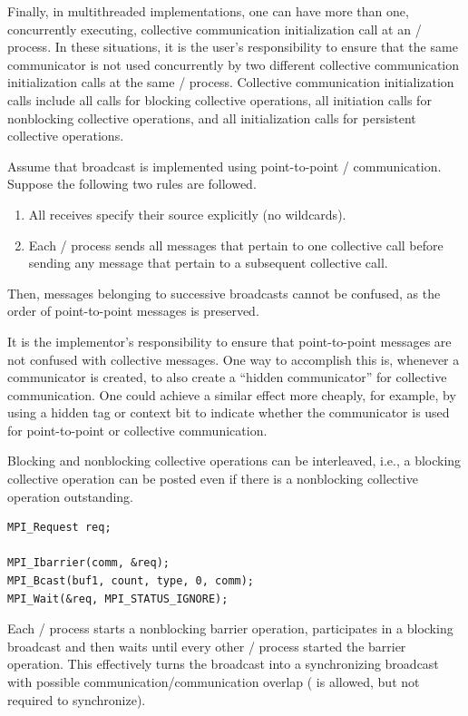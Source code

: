 Finally, in multithreaded implementations, one can have more than one,
concurrently executing, collective communication initialization call at an \MPI/ process.
In these situations, it is the user's responsibility to ensure that
the same communicator is not used concurrently by two different
collective communication initialization calls at the same \MPI/ process.
Collective communication initialization calls include
all calls for blocking collective operations,
all initiation calls for nonblocking collective operations, and
all initialization calls for persistent collective operations.

\begin{implementors}
Assume that broadcast is implemented using point-to-point \MPI/ communication.
Suppose the following two rules are followed.
\begin{enumerate}
\item
All receives specify their source explicitly (no wildcards).
\item
Each \MPI/ process sends all messages that pertain to one collective call before
sending any message that pertain to a subsequent collective call.
\end{enumerate}
Then, messages belonging to successive broadcasts cannot be confused,
as the order of point-to-point messages is preserved.

It is the implementor's responsibility to
ensure that point-to-point messages are not confused with collective
messages.  One way to accomplish this is, whenever a communicator is
created, to also create a ``hidden communicator'' for collective communication.
One could achieve a similar
effect more cheaply, for example, by using a hidden
tag or context bit to indicate
whether the communicator is used for point-to-point or collective
communication.
\end{implementors}

\begin{example}
\label{coll-nbexN1}
%
%
Blocking and nonblocking collective operations can be interleaved, i.e.,
a blocking collective operation can be posted even if there is a
nonblocking collective operation outstanding.

\begin{lstlisting}[language={[MPI]C}]
MPI_Request req;

MPI_Ibarrier(comm, &req);
MPI_Bcast(buf1, count, type, 0, comm);
MPI_Wait(&req, MPI_STATUS_IGNORE);
\end{lstlisting}

Each \MPI/ process starts a nonblocking barrier operation, participates in a
blocking broadcast and then waits until every other \MPI/ process started the
barrier operation. This effectively turns the broadcast into a
synchronizing broadcast with possible communication/communication
overlap ( is allowed, but not required to
synchronize).
\end{example}


